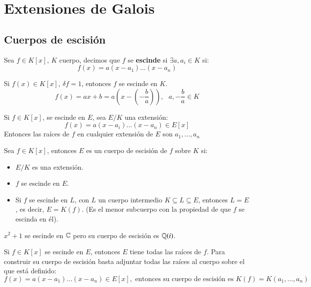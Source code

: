 
\chapter{Extensiones de Galois}

\section{Cuerpos de escisión}

\begin{dfn}
    Sea $f \in K[x]$, $K$ cuerpo, decimos que $f$ se \textbf{escinde} si $\exists a, a_i\in K$ si:
    $$
        f(x) = a(x - a_1) \ldots (x - a_n)
    $$
\end{dfn}

\begin{obs}
    Si $f(x) \in K[x]$, $\delta f = 1$, entonces $f$ se escinde en $K$.
    $$
        f(x) = ax + b = a \left(x - \left(- \frac{b}{a}\right)\right),\ \ \ a, -\frac{b}{a} \in K
    $$
\end{obs}

\begin{obs}
    Si $f \in K[x]$, se escinde en $E$, sea $E/K$ una extensión:
    $$
        f(x) = a (x - a_i) \ldots (x - a_n) \in E[x]
    $$
    Entonces las raíces de $f$ en cualquier extensión de $E$ son $a_1, \ldots, a_n$
\end{obs}

\begin{dfn}
Sea $f \in K[x]$, entonces $E$ es un cuerpo de escisión de $f$ sobre $K$ si:
    \begin{itemize}
        \item $E/K$ es una extensión.
        \item $f$ se escinde en $E$.
        \item Si $f$ se escinde en $L$, con $L$ un cuerpo intermedio $K \subseteq L \subseteq E$, entonces $L=E$, es decir, $E = K(f)$. (Es el menor subcuerpo con la propiedad de que $f$ se escinda en él).
    \end{itemize}
\end{dfn}

\begin{eg}
    $x^2 + 1$ se escinde en $\mathbb{C}$ pero su cuerpo de escisión es $\mathbb{Q}(i)$.
\end{eg}

\begin{obs}
    Si $f \in K[x]$ se escinde en $E$, entonces $E$ tiene todas las raíces de $f$. Para construir su cuerpo de escisión basta adjuntar todas las raíces al cuerpo sobre el que está definido:
    $$
        f(x) = a (x - a_1) \ldots (x - a_n) \in E[x], \text{ entonces su cuerpo de escisión es } K(f) = K(a_1, \ldots, a_n)
    $$
\end{obs}

